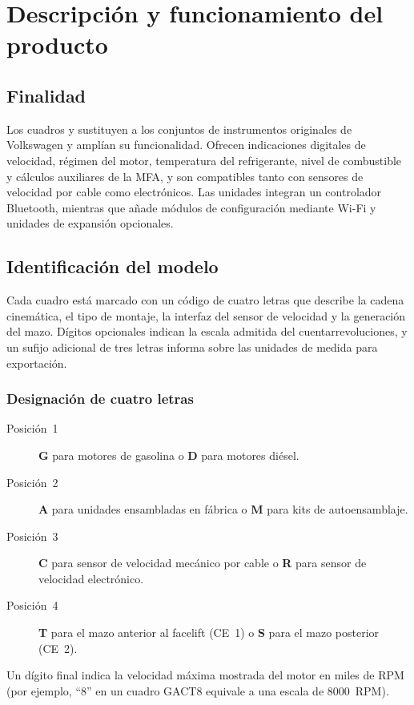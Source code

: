 \chapter{Descripción y funcionamiento del producto}\label{ch:description}

\section{Finalidad}
Los cuadros \ReplicaGenOne{} y \ReplicaNextLong{} sustituyen a los conjuntos de instrumentos originales de Volkswagen y amplían su funcionalidad. Ofrecen indicaciones digitales de velocidad, régimen del motor, temperatura del refrigerante, nivel de combustible y cálculos auxiliares de la MFA, y son compatibles tanto con sensores de velocidad por cable como electrónicos. Las unidades \ReplicaGenOneShort{} integran un controlador Bluetooth, mientras que \ReplicaNextShort{} añade módulos de configuración mediante Wi-Fi y unidades de expansión opcionales.

\section{Identificación del modelo}
Cada cuadro está marcado con un código de cuatro letras que describe la cadena cinemática, el tipo de montaje, la interfaz del sensor de velocidad y la generación del mazo. Dígitos opcionales indican la escala admitida del cuentarrevoluciones, y un sufijo adicional de tres letras informa sobre las unidades de medida para exportación.

\subsection{Designación de cuatro letras}
\begin{description}
    \item[Posición~1] \textbf{G} para motores de gasolina o \textbf{D} para motores diésel.
    \item[Posición~2] \textbf{A} para unidades ensambladas en fábrica o \textbf{M} para kits de autoensamblaje.
    \item[Posición~3] \textbf{C} para sensor de velocidad mecánico por cable o \textbf{R} para sensor de velocidad electrónico.
    \item[Posición~4] \textbf{T} para el mazo anterior al facelift (CE~1) o \textbf{S} para el mazo posterior (CE~2).
\end{description}
Un dígito final indica la velocidad máxima mostrada del motor en miles de RPM (por ejemplo, “8” en un cuadro GACT8 equivale a una escala de 8000~RPM).

